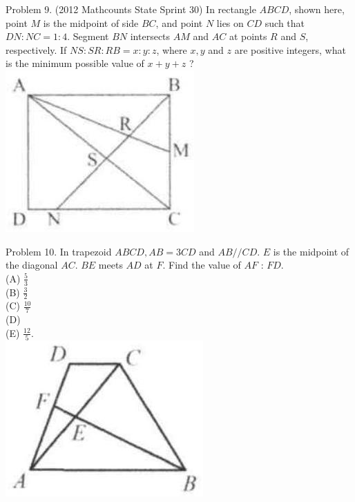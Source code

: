 \documentclass[10pt]{article}
\begin{document}
Problem 9. (2012 Mathcounts State Sprint 30) In rectangle \(A B C D\), shown here, point \(M\) is the midpoint of side \(B C\), and point \(N\) lies on \(C D\) such that \(D N: N C=1: 4\). Segment \(B N\) intersects \(A M\) and \(A C\) at points \(R\) and \(S\), respectively. If \(N S: S R: R B=x: y: z\), where \(x, y\) and \(z\) are positive integers, what is the minimum possible value of \(x+y+z\) ?\\
\includegraphics[max width=\textwidth, center]{2025_04_17_97bc1f7e44d93c271a88g-127(2)}


Problem 10. In trapezoid \(A B C D, A B=3 C D\) and \(A B / / C D\). \(E\) is the midpoint of the diagonal \(A C\). \(B E\) meets \(A D\) at \(F\). Find the value of \(A F\) : \(F D\).\\
(A) \(\frac{5}{3}\)\\
(B) \(\frac{3}{2}\)\\
(C) \(\frac{10}{7}\)\\
(D)\\
(E) \(\frac{12}{5}\).\\
\includegraphics[max width=\textwidth, center]{2025_04_17_97bc1f7e44d93c271a88g-128}
\end{document}
